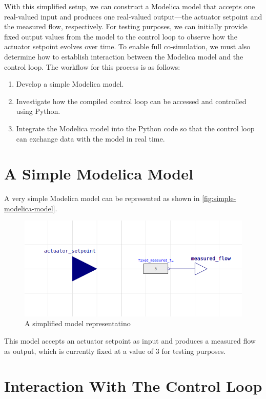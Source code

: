 \documentclass[we,final,11pt,oneside,openany]{uantwerpenbamathesis}
\begin{document}
With this simplified setup, we can construct a Modelica model that accepts one real-valued input and produces one real-valued output—the actuator setpoint and the measured flow, respectively.
For testing purposes, we can initially provide fixed output values from the model to the control loop to observe how the actuator setpoint evolves over time.
To enable full co-simulation, we must also determine how to establish interaction between the Modelica model and the control loop.
The workflow for this process is as follows:
\begin{enumerate}
    \item Develop a simple Modelica model.
    \item Investigate how the compiled control loop can be accessed and controlled using Python.
    \item Integrate the Modelica model into the Python code so that the control loop can exchange data with the model in real time.
\end{enumerate}

\newpage

\section{A Simple Modelica Model}
\label{sec:a-simple-modelica-model}

A very simple Modelica model can be represented as shown in \autoref{fig:simple-modelica-model}.
\begin{figure}[h!]
    \centering
    \includegraphics[width=0.6\linewidth]{Images/modelica/simple-representation}
    \caption{A simplified model representatino}
    \label{fig:simple-modelica-model}
\end{figure}

This model accepts an actuator setpoint as input and produces a measured flow as output, which is currently fixed at a value of 3 for testing purposes.

\section{Interaction With The Control Loop}
\label{sec:interaction-with-the-control-loop}
\end{document}
